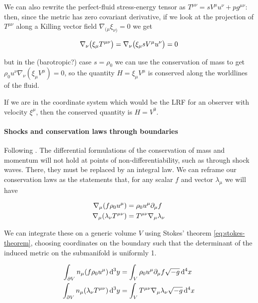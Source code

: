 \documentclass[main.tex]{subfiles}
\begin{document}
We can also rewrite the perfect-fluid stress-energy tensor as \(T^{\mu\nu} = s V^\mu u^\nu +p g^{\mu\nu}\): then, since the metric has zero covariant derivative, if we look at the projection of \(T^{\mu\nu}\) along a Killing vector field \(\nabla_{(\mu} \xi_{\nu)}=0\) we get

\begin{equation}
  \nabla_\nu \qty(\xi_\mu T^{\mu\nu}) = \nabla_\nu \qty(\xi_\mu s V^\mu u^\nu) = 0
\end{equation}

but in the (barotropic?) case \(s = \rho_0\) we can use the conservation of mass to get \(\rho_0 u^\nu \nabla_\nu (\xi_\mu V^\mu) = 0\), so the quantity \(H = \xi_\mu V^\mu\) is conserved along the worldlines of the fluid.

If we are in the coordinate system which would be the LRF for an observer with velocity \(\xi^\mu\), then the conserved quantity is \(H = V^0 \).

\paragraph{Shocks and conservation laws through boundaries}

Following \cite[section 13]{Taub:1978}.
The differential formulations of the conservation of mass and momentum will not hold at points of non-differentiability, such as through shock waves.
There, they must be replaced by an integral law.
We can reframe our conservation laws as the statements that, for any scalar \(f\) and vector \(\lambda_\mu\) we will have

\begin{subequations} \label{eq:conservation-laws-arbitrary-functions}
\begin{align}
  \nabla_\mu \qty(f \rho_0 u^\mu) &= \rho_0 u^\mu \partial_\mu f  \\
  \nabla_\mu \qty(\lambda_\nu T^{\mu\nu})&= T^{\mu\nu} \nabla_\mu \lambda_\nu
\end{align}
\end{subequations}

We can integrate these on a generic volume \(V\) using Stokes' theorem \eqref{eq:stokes-theorem}, choosing coordinates on the boundary such that the determinant of the induced metric on the submanifold is uniformly 1.

\begin{subequations} \label{eq:conservation-laws-arbitrary-functions-integral}
    \begin{align}
        \int _{\partial V} n_\mu \qty(f \rho_0 u^\mu) \dd[3]{y} &= \int_V \rho_0 u^\mu \partial_\mu f \sqrt{-g}  \dd[4]{x}  \\
        \int_{\partial V} n_\mu \qty(\lambda_\nu T^{\mu\nu}) \dd[3]{y}&= \int _V T^{\mu\nu} \nabla_\mu \lambda_\nu \sqrt{-g}  \dd[4]{x}
    \end{align}
\end{subequations}
\end{document}
